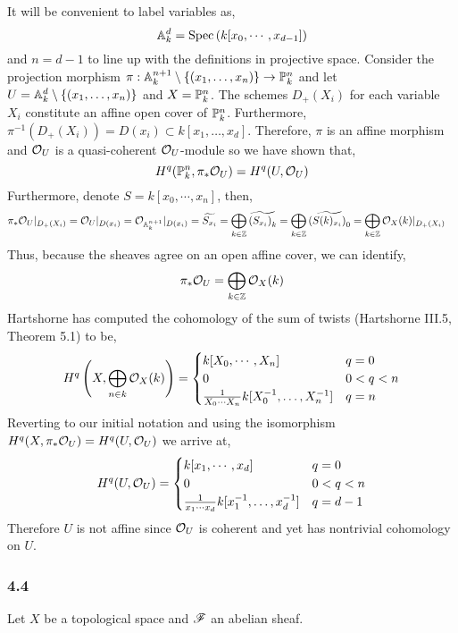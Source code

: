 \documentclass[12pt]{article}
\begin{document}
It will be convenient to label variables as,
\[ \A^d_k = \Spec{k[x_0, \cdots, x_{d-1}]} \]
and $n = d-1$ to line up with the definitions in projective space. Consider the projection morphism $\pi : \A^{n+1}_k \setminus \{ (x_1, \dots, x_n) \} \to \P^{n}_k$ and let $U = \A^d_k \setminus \{ (x_1, \dots, x_n) \}$ and $X = \P^n_k$. The schemes $D_{+}(X_i)$ for each variable $X_i$ constitute an affine open cover of $\P^{n}_k$. Furthermore, $\pi^{-1}(D_{+}(X_i)) = D(x_{i}) \subset k[x_1, \dots, x_d]$. Therefore, $\pi$ is an affine morphism and $\struct{U}$ is a quasi-coherent $\struct{U}$-module so we have shown that,
\[ H^q(\P^{n}_k, \pi_* \struct{U}) = H^q(U, \struct{U}) \] 
Furthermore, denote $S = k[x_0, \cdots, x_n]$, then,
\begin{align*}
\pi_* \struct{U} |_{D_{+}(X_i)} & = \struct{U} |_{D(x_{i})} = \struct{\A^{n+1}_k} |_{D(x_{i})} = \widetilde{S_{x_{i}}}  = \bigoplus_{k \in \Z} \widetilde{\left( S_{x_i} \right)_k} = \bigoplus_{k \in \Z} \widetilde{\left( S(k)_{x_i} \right)_{0}} = \bigoplus_{k \in \Z} \struct{X}(k)|_{D_+(X_i)}
\end{align*}
Thus, because the sheaves agree on an open affine cover, we can identify,
\[ \pi_* \struct{U} = \bigoplus_{k \in \Z} \struct{X}(k) \]
Hartshorne has computed the cohomology of the sum of twists (Hartshorne III.5, Theorem 5.1) to be,
\[  H^q \left(X, \bigoplus_{n \in k} \struct{X}(k) \right) = 
\begin{cases}
k[X_0, \cdots, X_n] & q = 0
\\
0 & 0 < q < n
\\
\frac{1}{X_0 \cdots X_n} k[X_0^{-1}, \dots, X_n^{-1}] & q = n 
\end{cases} \]
Reverting to our initial notation and using the isomorphism $H^q(X, \pi_* \struct{U}) = H^q(U, \struct{U})$ we arrive at,
\[ H^q(U, \struct{U}) = 
\begin{cases}
k[x_1, \cdots, x_d] & q = 0
\\
0 & 0 < q < n
\\
\frac{1}{x_1 \cdots x_d} k[x_1^{-1}, \dots, x_d^{-1}] & q = d-1 
\end{cases} \]
Therefore $U$ is not affine since $\struct{U}$ is coherent and yet has nontrivial cohomology on $U$.

\subsubsection{4.4}

Let $X$ be a topological space and $\F$ an abelian sheaf. 
\end{document}
